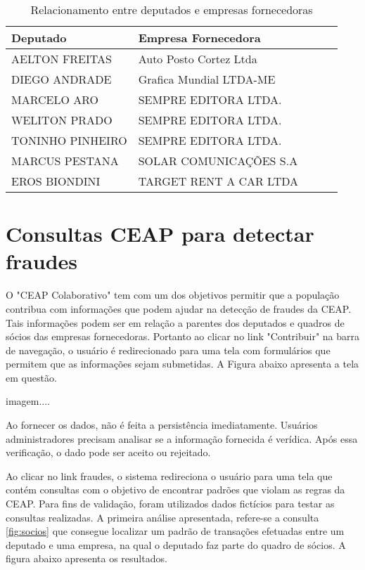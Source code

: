 \begin{table}[h!]
\centering
\begin{tabular}{|l|l|l|l|l|}
\hline
Deputado & Empresa Fornecedora \\ \hline
AELTON FREITAS & Auto Posto Cortez Ltda \\ \hline
DIEGO ANDRADE & Grafica Mundial LTDA-ME \\ \hline
MARCELO ARO & SEMPRE EDITORA LTDA. \\ \hline
WELITON PRADO & SEMPRE EDITORA LTDA. \\ \hline
TONINHO PINHEIRO & SEMPRE EDITORA LTDA. \\ \hline
MARCUS PESTANA & SOLAR COMUNICAÇÕES S.A \\ \hline
EROS BIONDINI & TARGET RENT A CAR LTDA \\ \hline
\end{tabular}
\caption{Relacionamento entre deputados e empresas fornecedoras}
\label{table:relation_deputies_companies}
\end{table}

\section{Consultas CEAP para detectar fraudes}

O "CEAP Colaborativo" tem com um dos objetivos permitir que a população contribua com informações que podem ajudar na detecção de fraudes da CEAP. Tais informações podem ser em relação a parentes dos deputados e quadros de sócios das empresas fornecedoras. Portanto ao clicar no link "Contribuir" na barra de navegação, o usuário é redirecionado para uma tela com formulários que permitem que as informações sejam submetidas. A Figura abaixo apresenta a tela em questão.

imagem....

Ao fornecer os dados, não é feita a persistência imediatamente. Usuários administradores precisam analisar se a informação fornecida é verídica. Após essa verificação, o dado pode ser aceito ou rejeitado.

Ao clicar no link fraudes, o sistema redireciona o usuário para uma tela que contém consultas com o objetivo de encontrar padrões que violam as regras da CEAP. Para fins de validação, foram utilizados dados fictícios para testar as consultas realizadas. A primeira análise apresentada, refere-se a consulta \ref{fig:socios} que consegue localizar um padrão de transações efetuadas entre um deputado e uma empresa, na qual o deputado faz parte do quadro de sócios. A figura abaixo apresenta os resultados.

